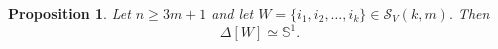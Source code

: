 \documentclass[12pt,reqno]{amsart}
\newtheorem{lemma}[theorem]{Lemma}
\newtheorem{proposition}[theorem]{Proposition}
\theoremstyle{definition}
\numberwithin{equation}{section}
\def\C{\mathcal{C}}
\begin{document}
%
%	

\begin{proposition}\label{prop:circle}
	Let $n\geq 3m+1$ and let \( 	W=\{i_1,i_2,\ldots,i_k\}\in\mathcal{S}_V(k,m). \)
	Then
	\[
	\Delta[W]\simeq\mathbb{S}^1.
	\]
\end{proposition}
\end{document}
